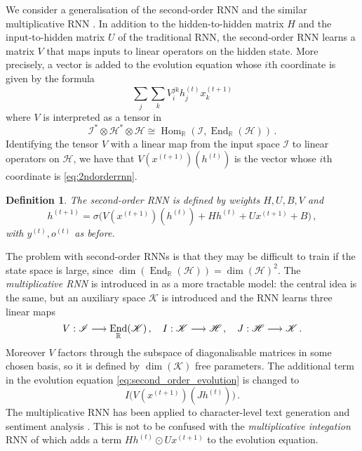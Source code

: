 \documentclass[english,letter paper,12pt,leqno]{article}
\theoremstyle{example}
\newtheorem{definition}[theorem]{Definition}
\numberwithin{equation}{section}
\def\Hom{\operatorname{Hom}}
\def\be{\begin{equation}}
\def\ee{\end{equation}}
\DeclareMathOperator{\End}{End}
\begin{document}
We consider a generalisation of the second-order RNN \cite{highorderrec,pollack,firstvsecond,secondorder} and the similar multiplicative RNN \cite{sutskever}. In addition to the hidden-to-hidden matrix $H$ and the input-to-hidden matrix $U$ of the traditional RNN, the second-order RNN learns a matrix $V$ that maps inputs to linear operators on the hidden state. More precisely, a vector is added to the evolution equation whose $i$th coordinate is given by the formula
\be\label{eq:2ndorderrnn}
\sum_j \sum_k V^{jk}_{i} h^{(t)}_j x^{(t+1)}_k
\ee
where $V$ is interpreted as a tensor in
\be\label{eq:input_to_operator}
\mathscr{I}^* \otimes \mathscr{H}^* \otimes \mathscr{H} \cong \Hom_{\mathbb{R}}(\mathscr{I} , \End_{\mathbb{R}}(\mathscr{H}))\,.
\ee
Identifying the tensor $V$ with a linear map from the input space $\mathscr{I}$ to linear operators on $\mathscr{H}$, we have that $V(x^{(t+1)})(h^{(t)})$ is the vector whose $i$th coordinate is \eqref{eq:2ndorderrnn}. 

\begin{definition} The second-order RNN \cite{highorderrec,pollack} is defined by weights $H,U,B,V$ and
\be\label{eq:second_order_evolution}
h^{(t+1)} = \sigma\big( V( x^{(t+1)} )(h^{(t)}) + H h^{(t)} + U x^{(t+1)} + B\big)\,,
\ee 
with $y^{(t)}, o^{(t)}$ as before.
\end{definition}

The problem with second-order RNNs is that they may be difficult to train if the state space is large, since $\dim(\End_{\mathbb{R}}(\mathscr{H})) = \dim(\mathscr{H})^2$. The \emph{multiplicative RNN} is introduced in \cite{sutskever} as a more tractable model: the central idea is the same, but an auxiliary space $\mathscr{K}$ is introduced and the RNN learns three linear maps
\be\label{eq:threelinearmaps}
V: \mathscr{I} \lto \End_{\mathbb{R}}(\mathscr{K})\,, \quad I: \mathscr{K} \lto \mathscr{H}\,, \quad J: \mathscr{H} \lto \mathscr{K}\,.
\ee
Moreover $V$ factors through the subspace of diagonalisable matrices in some chosen basis, so it is defined by $\dim(\mathscr{K})$ free parameters. The additional term in the evolution equation \eqref{eq:second_order_evolution} is changed to
\be\label{eq:new_term_mRNN}
I\big( V(x^{(t+1)})( J h^{(t)} ) \big)\,.
\ee
The multiplicative RNN has been applied to character-level text generation \cite{sutskever} and sentiment analysis \cite{irsoy}. This is not to be confused with the \emph{multiplicative integation} RNN of \cite{yuhai} which adds a term $H h^{(t)} \odot U x^{(t+1)}$ to the evolution equation.
\end{document}
